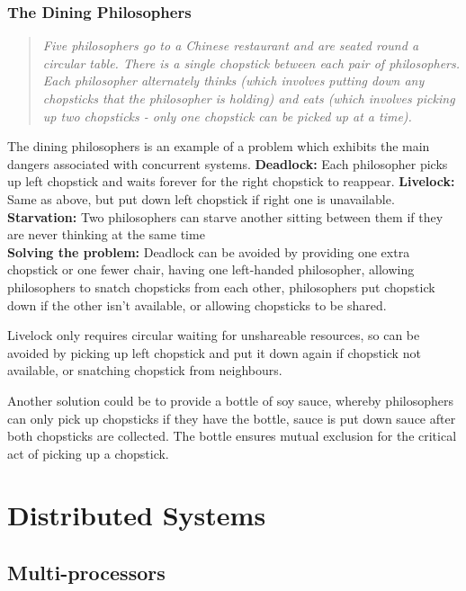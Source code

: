 \documentclass[a4paper,oneside]{report}
\begin{document}
    	\subsection{The Dining Philosophers}
    	\begin{quotation}\emph{
    	Five philosophers go to a Chinese restaurant and are seated round a circular table.  There is a single chopstick between each pair of philosophers. Each philosopher alternately thinks (which involves putting down any chopsticks that the philosopher is holding) and eats (which involves picking up two chopsticks - only one chopstick can be picked up at a time).}
    	\end{quotation}
    	
    	The dining philosophers is an example of a problem which exhibits the main dangers associated with concurrent systems. \textbf{Deadlock:} Each philosopher picks up left chopstick and waits forever for the right chopstick to reappear. \textbf{Livelock:} Same as above, but put down left chopstick if right one is unavailable. \textbf{Starvation:} Two philosophers can starve another sitting between them if they are never thinking at the same time\\
    	
\textbf{Solving the problem:} Deadlock can be avoided by providing one extra chopstick or one fewer chair, having one left-handed philosopher, allowing philosophers to snatch chopsticks from each other, philosophers put chopstick down if the other isn’t available, or allowing chopsticks to be shared.   
    	 
 	 	Livelock only requires circular waiting for unshareable resources, so can be avoided by picking up left chopstick and put it down again if chopstick not available, or snatching chopstick from neighbours.
    	 
Another solution could be to provide a bottle of soy sauce, whereby philosophers can only pick up chopsticks if they have the bottle, sauce is put down sauce after both chopsticks are collected. The bottle ensures mutual exclusion for the critical act of picking up a chopstick.
    	
\chapter{Distributed Systems}

	\section{Multi-processors}
	
\end{document}
